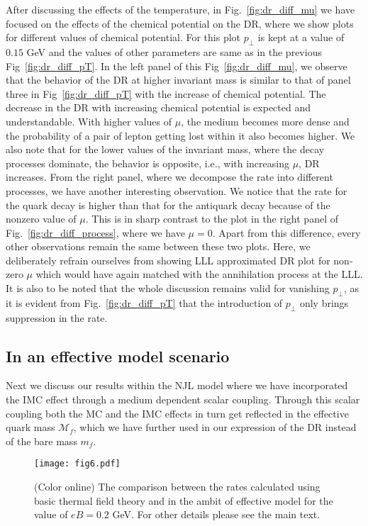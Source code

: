 \documentclass[aps,prd,floatfix,showpacs,showkeys,superscriptadress,unsortedaddress,nofootinbib,onecolumn]{revtex4-1}
\newcommand{\sperp}{\scriptscriptstyle{\perp}}
\begin{document}
After discussing the effects of the temperature, in Fig.~\ref{fig:dr_diff_mu} we have focused on the effects of the chemical potential on the DR, where we show plots for different values of chemical potential. For this plot $p_{\sperp}$ is kept at a value of $0.15$ GeV and the values of other parameters are same as in the previous Fig~\ref{fig:dr_diff_pT}. In the left panel of this Fig~\ref{fig:dr_diff_mu}, we observe that the behavior of the DR at higher invariant mass is similar to that of panel three in Fig~\ref{fig:dr_diff_pT} with the increase of chemical potential. The decrease in the DR with increasing chemical potential is expected and understandable. With higher values of $\mu$, the medium becomes more dense and the probability of a pair of lepton getting lost within it also becomes higher. We also note that for the lower values of the invariant mass, where the decay processes dominate, the behavior is opposite, i.e., with increasing $\mu$, DR increases. From the right panel, where we decompose the rate into different processes, we have another interesting observation. We notice that the rate for the quark decay is higher than that for the antiquark decay because of the nonzero value of $\mu$. This is in sharp contrast to the plot in the right panel of Fig.~\ref{fig:dr_diff_process}, where we have $\mu=0$. Apart from this difference, every other observations remain the same between these two plots. Here, we deliberately refrain ourselves from showing LLL approximated DR plot for non-zero $\mu$ which would have again matched with the annihilation process at the LLL. It is also to be noted that the whole discussion remains valid for vanishing $p_{\sperp}$, as it is evident from Fig.~\ref{fig:dr_diff_pT} that the introduction of $p_{\sperp}$ only brings suppression in the rate.

\subsection{In an effective model scenario}
\label{ssec:res_eff_model}
Next we discuss our results within the NJL model where we have incorporated the IMC effect through a medium dependent scalar coupling. Through this scalar coupling both the MC and the IMC effects in turn get reflected in the effective quark mass $\mathcal{M}_f$, which we have further used in our expression of the DR instead of the bare mass $m_f$.
\begin{figure}
\begin{center}
\texttt{[image: fig6.pdf]}
\caption{(Color online) The comparison between the rates calculated using basic thermal field theory and in the ambit of effective model for the value of $eB=0.2$ GeV. For other details please see the main text.}
\label{fig:dr_eff_mod_com}
\end{center}
\end{figure}
\end{document}
